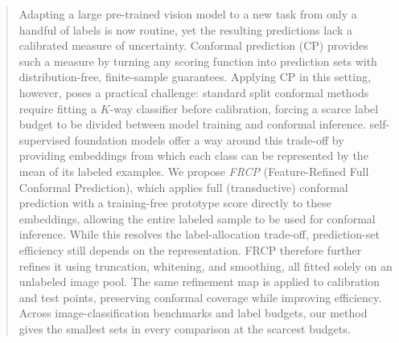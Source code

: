 \begin{abstract}
Adapting a large pre-trained vision model to a new task from only a handful of labels is now routine, yet the resulting predictions lack a calibrated measure of uncertainty. Conformal prediction (CP) provides such a measure by turning any scoring function into prediction sets with distribution-free, finite-sample guarantees. Applying CP in this setting, however, poses a practical challenge: standard split conformal methods require fitting a $K$-way classifier before calibration, forcing a scarce label budget to be divided between model training and conformal inference. self-supervised foundation models offer a way around this trade-off by providing embeddings from which each class can be represented by the mean of its labeled examples. We propose \emph{FRCP} (Feature-Refined Full Conformal Prediction), which applies full (transductive) conformal prediction with a training-free prototype score directly to these embeddings, allowing the entire labeled sample to be used for conformal inference. While this resolves the label-allocation trade-off, prediction-set efficiency still depends on the representation. FRCP therefore further refines it using truncation, whitening, and smoothing, all fitted solely on an unlabeled image pool. The same refinement map is applied to calibration and test points, preserving conformal coverage while improving efficiency. Across image-classification benchmarks and label budgets, our method gives the smallest sets in every comparison at the scarcest budgets.
\end{abstract}


%
%
%
%
%
